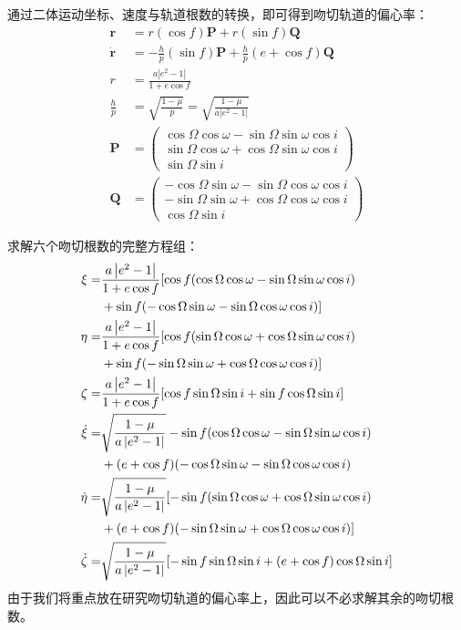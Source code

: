 通过二体运动坐标、速度与轨道根数的转换，即可得到吻切轨道的偏心率：
\begin{align}
    \boldsymbol{r}&=r(\cos f)\boldsymbol{P}+r(\sin f)\boldsymbol{Q}
    \\\dot{\boldsymbol{r}}&=-\frac{h}{p}(\sin f)\boldsymbol{P}+\frac{h}{p}(e+\cos f)\boldsymbol{Q}
    \\r&=\frac{a\left| e^2-1\right|}{1+e\cos f}
    \\\frac{h}{p}&=\sqrt{\frac{1-\mu}{p}}=\sqrt{\frac{1-\mu}{a\left| e^2-1\right|}}
    \\\boldsymbol{P}&=
        \left(
        \begin{array}{cc}
        \cos\Omega\cos\omega-\sin\Omega\sin\omega\cos i\\
        \sin\Omega\cos\omega+\cos\Omega\sin\omega\cos i\\
        \sin\Omega\sin i
        \end{array}
        \right)
    \\\boldsymbol{Q}&=
        \left(
        \begin{array}{cc}
        -\cos\Omega\sin\omega-\sin\Omega\cos\omega\cos i\\
        -\sin\Omega\sin\omega+\cos\Omega\cos\omega\cos i\\
        \cos\Omega\sin i
        \end{array}
        \right)
\end{align}

求解六个吻切根数的完整方程组：
\begin{align}
    \xi=&\frac{a\left| e^2-1\right|}{1+e\cos f}[\cos f(\cos\Omega\cos\omega-\sin\Omega\sin\omega\cos i)
    \notag\\&+\sin f(-\cos\Omega\sin\omega-\sin\Omega\cos\omega\cos i)]
    \\\eta=&\frac{a\left| e^2-1\right|}{1+e\cos f}[\cos f(\sin\Omega\cos\omega+\cos\Omega\sin\omega\cos i)
    \notag\\&+\sin f(-\sin\Omega\sin\omega+\cos\Omega\cos\omega\cos i)]
    \\\zeta=&\frac{a\left| e^2-1\right|}{1+e\cos f}[\cos f\sin\Omega\sin i+\sin f\cos\Omega\sin i]
    \\\dot{\xi}=&\sqrt{\frac{1-\mu}{a\left| e^2-1\right|}}-\sin f(\cos\Omega\cos\omega-\sin\Omega\sin\omega\cos i)
    \notag\\&+(e+\cos f)(-\cos\Omega\sin\omega-\sin\Omega\cos\omega\cos i)
    \\\dot{\eta}=&\sqrt{\frac{1-\mu}{a\left| e^2-1\right|}}[-\sin f(\sin\Omega\cos\omega+\cos\Omega\sin\omega\cos i)
    \notag\\&+(e+\cos f)(-\sin\Omega\sin\omega+\cos\Omega\cos\omega\cos i)]
    \\\dot{\zeta}=&\sqrt{\frac{1-\mu}{a\left| e^2-1\right|}}[-\sin f\sin\Omega\sin i+(e+\cos f)\cos\Omega\sin i]
\end{align}
由于我们将重点放在研究吻切轨道的偏心率上，因此可以不必求解其余的吻切根数。

